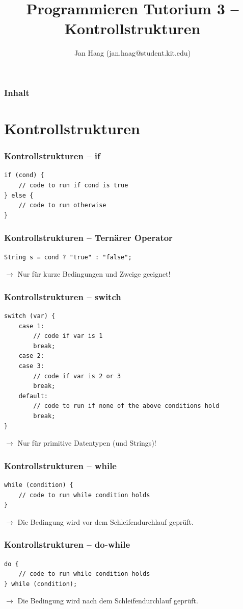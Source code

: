 \documentclass{beamer}
\author{Jan Haag (jan.haag@student.kit.edu)}
\title{Programmieren Tutorium 3 -- Kontrollstrukturen}
\institute{Institut f\"{u}r Theoretische Informatik}
\begin{document}
\begin{frame}
\maketitle
\end{frame}

\begin{frame}
\frametitle{Inhalt}
\tableofcontents
\end{frame}

\section{Kontrollstrukturen}
\begin{frame}[fragile]
\frametitle{Kontrollstrukturen -- if}
\begin{verbatim}
if (cond) {
    // code to run if cond is true
} else {
    // code to run otherwise
}
\end{verbatim}
\end{frame}

\begin{frame}[fragile]
\frametitle{Kontrollstrukturen -- Tern\"{a}rer Operator}
\begin{verbatim}
String s = cond ? "true" : "false";
\end{verbatim}
$\rightarrow$ Nur f\"{u}r kurze Bedingungen und Zweige geeignet!
\end{frame}

\begin{frame}[fragile]
\frametitle{Kontrollstrukturen -- switch}
\begin{verbatim}
switch (var) {
    case 1:
        // code if var is 1
        break;
    case 2:
    case 3:
        // code if var is 2 or 3
        break;
    default:
        // code to run if none of the above conditions hold
        break;
}
\end{verbatim}
$\rightarrow$ Nur f\"{u}r primitive Datentypen (und Strings)!
\end{frame}

\begin{frame}[fragile]
\frametitle{Kontrollstrukturen -- while}
\begin{verbatim}
while (condition) {
    // code to run while condition holds
}
\end{verbatim}
$\rightarrow$ Die Bedingung wird vor dem Schleifendurchlauf gepr\"{u}ft.
\end{frame}

\begin{frame}[fragile]
\frametitle{Kontrollstrukturen -- do-while}
\begin{verbatim}
do {
    // code to run while condition holds
} while (condition);
\end{verbatim}
$\rightarrow$ Die Bedingung wird nach dem Schleifendurchlauf gepr\"{u}ft.
\end{frame}
\end{document}

